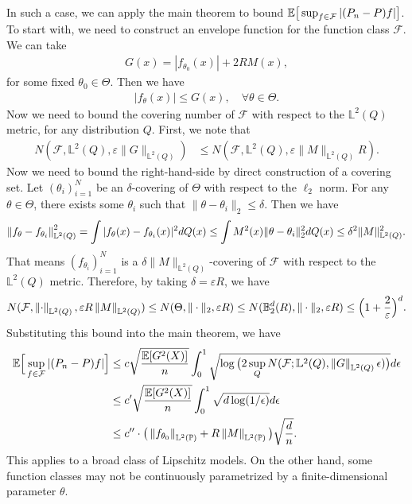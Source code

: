 \documentclass[11pt,letterpaper]{article}
\numberwithin{theorem}{lecture}
\numberwithin{proposition}{lecture}
\numberwithin{lemma}{lecture}
\numberwithin{claim}{lecture}
\numberwithin{corollary}{lecture}
\numberwithin{definition}{lecture}
\numberwithin{conjecture}{lecture}
\numberwithin{remark}{lecture}
\numberwithin{example}{lecture}
\numberwithin{equation}{lecture}
\begin{document}
In such a case, we can apply the main theorem to bound ${\mathbb{E}} \big[\sup_{f \in \mathcal{F}} |(P_n - P) f| \big]$. To start with, we need to construct an envelope function for the function class $\mathcal{F}$. We can take
\begin{align*}
  G (x) = |f_{\theta_0} (x)| + 2 R M(x),
\end{align*}
for some fixed $\theta_0 \in \Theta$. Then we have
\begin{align*}
  |f_\theta (x)| \leq G (x), \quad \forall \theta \in \Theta.
\end{align*}
Now we need to bound the covering number of $\mathcal{F}$ with respect to the $\mathbb{L}^2 (Q)$ metric, for any distribution $Q$. First, we note that
\begin{align*}
  N ( \mathcal{F}, \mathbb{L}^2 (Q), \varepsilon \|G\|_{\mathbb{L}^2 (Q)}) & \leq N (\mathcal{F}, \mathbb{L}^2 (Q), \varepsilon \|M\|_{\mathbb{L}^2 (Q)} R).
\end{align*}
Now we need to bound the right-hand-side by direct construction of a covering set. Let $(\theta_i)_{i = 1}^N$ be an $\delta$-covering of $\Theta$ with respect to the $\ell_2$ norm. For any $\theta \in \Theta$, there exists some $\theta_i$ such that $\|\theta - \theta_i\|_2 \leq \delta$. Then we have
\begin{align*}
  \left\| f_\theta - f_{\theta_i}\right\|_{\mathbb{L}^2 (Q)}^2 = \int | f_\theta (x) - f_{\theta_i} (x)|^2 d Q(x) \leq \int M^2 (x) \|\theta - \theta_i\|_2^2 d Q(x) \leq \delta^2 \|M\|_{\mathbb{L}^2 (Q)}^2.
\end{align*}
That means $(f_{\theta_i})_{i = 1}^N$ is a $\delta \|M\|_{\mathbb{L}^2 (Q)}$-covering of $\mathcal{F}$ with respect to the $\mathbb{L}^2 (Q)$ metric. Therefore, by taking $\delta = \varepsilon R$, we have
\begin{align*}
  N (\mathcal{F}, \left\| \cdot\right\|_{\mathbb{L}^2 (Q)}, \varepsilon R \left\| M\right\|_{\mathbb{L}^2 (Q)} ) \leq N (\Theta, \|\cdot\|_2, \varepsilon R) \leq N (\mathbb{B}_2^d (R), \|\cdot\|_2, \varepsilon R) \leq \Big( 1 + \frac{2}{\varepsilon} \Big)^d.
\end{align*}
Substituting this bound into the main theorem, we have
\begin{align*}
  {\mathbb{E}} \Big[\sup_{f \in \mathcal{F}} |(P_n - P) f| \Big] &\leq c \sqrt{\frac{{\mathbb{E}} [G^2 (X)]}{n}}\int_0^{1} \sqrt{\log \big(2\sup_{Q} N (\mathcal{F}; \mathbb{L}^2 (Q), \left\| G\right\|_{\mathbb{L}^2 (Q)} \epsilon)\big)} d \epsilon\\
  &\leq c' \sqrt{\frac{{\mathbb{E}} [G^2 (X)]}{n}}\int_0^{1} \sqrt{d\log (1/\epsilon)} d \epsilon\\
  &\leq c'' \cdot \big( \left\| f_{\theta_0}\right\|_{\mathbb{L}^2 ({\mathbb{P}})} + R \left\| M\right\|_{\mathbb{L}^2 ({\mathbb{P}})}  \big)  \sqrt{\frac{d}{n}}.
\end{align*}
This applies to a broad class of Lipschitz models. On the other hand, some function classes may not be continuously parametrized by a finite-dimensional parameter $\theta$.
\end{document}
